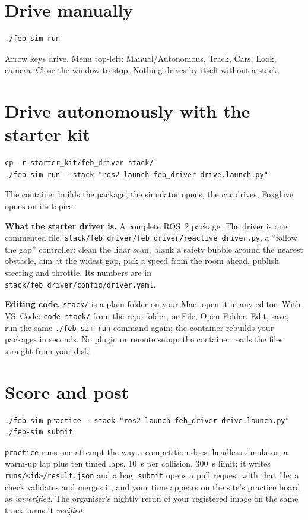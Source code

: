 \documentclass[11pt,a4paper]{article}
\begin{document}
\section{Drive manually}

\begin{lstlisting}
./feb-sim run
\end{lstlisting}

Arrow keys drive. Menu top-left: Manual/Autonomous, Track, Cars, Look, camera. Close the
window to stop. Nothing drives by itself without a stack.

\section{Drive autonomously with the starter kit}

\begin{lstlisting}
cp -r starter_kit/feb_driver stack/
./feb-sim run --stack "ros2 launch feb_driver drive.launch.py"
\end{lstlisting}

The container builds the package, the simulator opens, the car drives, Foxglove opens on its
topics.

\textbf{What the starter driver is.} A complete ROS~2 package. The driver is one commented file,
\texttt{stack/feb\_driver/feb\_driver/reactive\_driver.py}, a ``follow the gap'' controller: clean
the lidar scan, blank a safety bubble around the nearest obstacle, aim at the widest gap, pick a
speed from the room ahead, publish steering and throttle. Its numbers are in
\texttt{stack/feb\_driver/config/driver.yaml}.

\textbf{Editing code.} \texttt{stack/} is a plain folder on your Mac; open it in any editor. With
VS~Code: \texttt{code stack/} from the repo folder, or File, Open Folder. Edit, save, run the same
\texttt{./feb-sim run} command again; the container rebuilds your packages in seconds. No plugin
or remote setup: the container reads the files straight from your disk.

\section{Score and post}

\begin{lstlisting}
./feb-sim practice --stack "ros2 launch feb_driver drive.launch.py"
./feb-sim submit
\end{lstlisting}

\texttt{practice} runs one attempt the way a competition does: headless simulator, a warm-up lap
plus ten timed laps, 10~s per collision, 300~s limit; it writes \texttt{runs/<id>/result.json} and a
bag. \texttt{submit} opens a pull request with that file; a check validates and merges it, and your
time appears on the site's practice board as \emph{unverified}. The organiser's nightly rerun of your
registered image on the same track turns it \emph{verified}.
\end{document}
